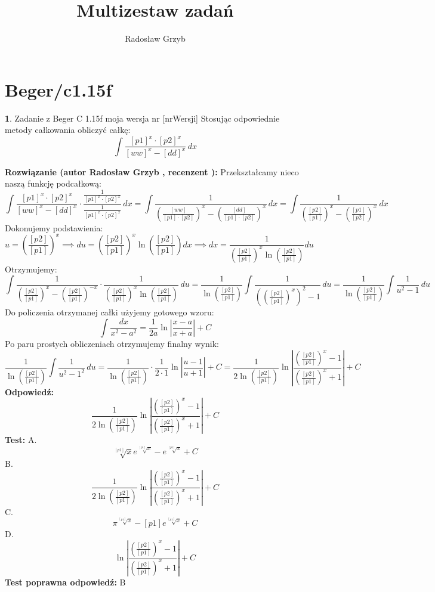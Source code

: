 \documentclass[12pt, a4paper]{article}
\title{Multizestaw zadań}
\author{Radosław Grzyb}
\date{}
\theoremstyle{definition} %
\newtheorem{zad}{}
\newcommand{\kategoria}[1]{\section{#1}} %
\newcommand{\zadStart}[1]{\begin{zad}#1\newline} %
\newcommand{\zadStop}{\end{zad}}   %
\newcommand{\rozwStart}[2]{\noindent \textbf{Rozwiązanie (autor #1 , recenzent #2): }\newline} %
\newcommand{\rozwStop}{\newline}                                            %
\newcommand{\odpStart}{\noindent \textbf{Odpowiedź:}\newline}    %
\newcommand{\odpStop}{\newline}                                             %
\newcommand{\testStart}{\noindent \textbf{Test:}\newline} %
\newcommand{\testStop}{\newline} %
\newcommand{\kluczStart}{\noindent \textbf{Test poprawna odpowiedź:}\newline} %
\newcommand{\kluczStop}{\newline} %
\begin{document}
\maketitle
\kategoria{Beger/c1.15f}
\zadStart{Zadanie z Beger C 1.15f moja wersja nr [nrWersji]}
Stosując odpowiednie metody całkowania obliczyć całkę:
$$\int \frac{[p1]^x\cdot[p2]^x}{[ww]^x-[dd]^x}\,dx$$
\zadStop
\rozwStart{Radosław Grzyb}{}
Przekształcamy nieco naszą funkcję podcałkową:
$$\int \frac{[p1]^x\cdot[p2]^x}{[ww]^x-[dd]^x}\cdot\frac{\frac{1}{[p1]^x\cdot[p2]^x}}{\frac{1}{[p1]^x\cdot[p2]^x}}\,dx=\int \frac{1}{\left(\frac{[ww]}{[p1]\cdot[p2]}\right)^x-\left(\frac{[dd]}{[p1]\cdot[p2]}\right)^x}\,dx=\int \frac{1}{\left(\frac{[p2]}{[p1]}\right)^x-\left(\frac{[p1]}{[p2]}\right)^x}\,dx$$
Dokonujemy podstawienia:
$$u=\left(\frac{[p2]}{[p1]}\right)^x\implies du=
\left(\frac{[p2]}{[p1]}\right)^{x}\ln{\left(\frac{[p2]}{[p1]}\right)}dx\implies dx=\frac{1}{\left(\frac{[p2]}{[p1]}\right)^{x}\ln{\left(\frac{[p2]}{[p1]}\right)}}du$$
Otrzymujemy:
$$\int \frac{1}{\left(\frac{[p2]}{[p1]}\right)^x-\left(\frac{[p2]}{[p1]}\right)^{-x}}\cdot\frac{1}{\left(\frac{[p2]}{[p1]}\right)^{x}\ln{\left(\frac{[p2]}{[p1]}\right)}}\,du=\frac{1}{\ln{\left(\frac{[p2]}{[p1]}\right)}}\int\frac{1}{\left(\left(\frac{[p2]}{[p1]}\right)^{x}\right)^2-1} \,du=\frac{1}{\ln{\left(\frac{[p2]}{[p1]}\right)}}\int\frac{1}{u^2-1} \,du$$
Do policzenia otrzymanej całki użyjemy gotowego wzoru: $$\int\frac{dx}{x^2-a^2}=\frac{1}{2a}\ln\left|\frac{x-a}{x+a}\right|+C$$
Po paru prostych obliczeniach otrzymujemy finalny wynik:
$$\frac{1}{\ln{\left(\frac{[p2]}{[p1]}\right)}}\int\frac{1}{u^2-1^2} \,du=\frac{1}{\ln{\left(\frac{[p2]}{[p1]}\right)}}\cdot\frac{1}{2\cdot1}\ln\left|\frac{u-1}{u+1}\right|+C=\frac{1}{2\ln{\left(\frac{[p2]}{[p1]}\right)}}\ln\left|\frac{\left(\frac{[p2]}{[p1]}\right)^x-1}{\left(\frac{[p2]}{[p1]}\right)^x+1}\right|+C$$
\rozwStop
\odpStart
$$\frac{1}{2\ln{\left(\frac{[p2]}{[p1]}\right)}}\ln\left|\frac{\left(\frac{[p2]}{[p1]}\right)^x-1}{\left(\frac{[p2]}{[p1]}\right)^x+1}\right|+C$$
\odpStop
\testStart
A.$$\sqrt[[p1]]{x}e^{\sqrt[[p1]]{x}}-e^{\sqrt[[p1]]{x}}+C$$
B.$$\frac{1}{2\ln{\left(\frac{[p2]}{[p1]}\right)}}\ln\left|\frac{\left(\frac{[p2]}{[p1]}\right)^x-1}{\left(\frac{[p2]}{[p1]}\right)^x+1}\right|+C$$
C.$$\pi^{\sqrt[[p1]]{x}}-[p1]e^{\sqrt[[p1]]{x}}+C$$
D.$$\ln\left|\frac{\left(\frac{[p2]}{[p1]}\right)^x-1}{\left(\frac{[p2]}{[p1]}\right)^x+1}\right|+C$$
\testStop
\kluczStart
B
\kluczStop
\end{document}
